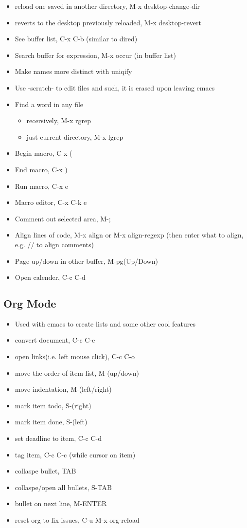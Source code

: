 \documentclass[11pt]{article}
\begin{document}
\begin{itemize}
\item reload one saved in another directory, M-x desktop-change-dir
\item reverts to the desktop previously reloaded, M-x desktop-revert
\item See buffer list, C-x C-b (similar to dired)
\item Search buffer for expression, M-x occur (in buffer list)
\item Make names more distinct with uniqify
\item Use -scratch- to edit files and such, it is erased upon leaving emacs
\item Find a word in any file
\begin{itemize}
\item recersively, M-x rgrep
\item just current directory, M-x lgrep
\end{itemize}
\item Begin macro, C-x (
\item End macro, C-x )
\item Run macro, C-x e
\item Macro editor, C-x C-k e
\item Comment out selected area, M-;
\item Align lines of code, M-x align or M-x align-regexp (then enter what to align, e.g. // to align comments)
\item Page up/down in other buffer, M-pg(Up/Down)
\item Open calender, C-c C-d
\end{itemize}
\subsection{Org Mode}
\label{sec:orgaae13b2}
\begin{itemize}
\item Used with emacs to create lists and some other cool features
\item convert document, C-c C-e
\item open links(i.e. left mouse click), C-c C-o
\item move the order of item list, M-(up/down)
\item move indentation, M-(left/right)
\item mark item todo, S-(right)
\item mark item done, S-(left)
\item set deadline to item, C-c C-d
\item tag item, C-c C-c (while cursor on item)
\item collaspe bullet, TAB
\item collaspe/open all bullets, S-TAB
\item bullet on next line, M-ENTER
\item reset org to fix issues, C-u M-x org-reload
\end{itemize}
\end{document}
